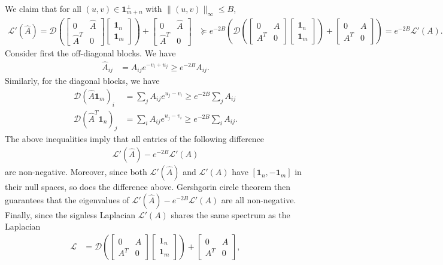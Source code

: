 We claim that for all $(u,v) \in \mathbf{1}_{m+n}^\perp$ with $\|(u,v)\|_\infty\leq B$, 
\begin{align*}
\mathcal{L}'(\hat{A})=\mathcal{D}(\begin{bmatrix}0 & \hat{A}\\
\hat{A}^{T} & 0
\end{bmatrix}\begin{bmatrix}\mathbf{1}_{n}\\
\mathbf{1}_{m}
\end{bmatrix})+\begin{bmatrix}0 & \hat{A}\\
\hat{A}^{T} & 0
\end{bmatrix} & \succeq e^{-2B}(\mathcal{D}(\begin{bmatrix}0 & A\\
A^{T} & 0
\end{bmatrix}\begin{bmatrix}\mathbf{1}_{n}\\
\mathbf{1}_{m}
\end{bmatrix})+\begin{bmatrix}0 & A\\
A^{T} & 0
\end{bmatrix})=e^{-2B}\mathcal{L}'(A).
\end{align*}
 Consider first the off-diagonal blocks. We have 
\begin{align*}
\hat{A}_{ij} & =A_{ij}e^{-v_{i}+u_{j}}\geq e^{-2B}A_{ij}.
\end{align*}
 Similarly, for the diagonal blocks, we have 
\begin{align*}
\mathcal{D}(\hat{A}\mathbf{1}_{m})_{i} & =\sum_{j}A_{ij}e^{u_{j}-v_{i}}\geq e^{-2B}\sum_{j}A_{ij}\\
\mathcal{D}(\hat{A}^{T}\mathbf{1}_{n})_{j} & =\sum_{i}A_{ij}e^{u_{j}-v_{i}}\geq e^{-2B}\sum_{i}A_{ij}.
\end{align*}
 The above inequalities imply that all entries of the following difference 
\begin{align*}
\mathcal{L}'(\hat{A})-e^{-2B}\mathcal{L}'(A)
\end{align*}
are non-negative. Moreover, since both $\mathcal{L}'(\hat{A})$ and
$\mathcal{L}'(A)$ have $[\mathbf{1}_{n},-\mathbf{1}_{m}]$ in their
null spaces, so does the difference above. Gershgorin circle theorem
then guarantees that the eigenvalues of $\mathcal{L}'(\hat{A})-e^{-2B}\mathcal{L}'(A)$
are all non-negative. Finally, since the signless Laplacian $\mathcal{L}'(A)$
shares the same spectrum as the Laplacian 
\begin{align*}
\mathcal{L} & =\mathcal{D}(\begin{bmatrix}0 & A\\
A^{T} & 0
\end{bmatrix}\begin{bmatrix}\mathbf{1}_{n}\\
\mathbf{1}_{m}
\end{bmatrix})+\begin{bmatrix}0 & A\\
A^{T} & 0
\end{bmatrix},
\end{align*}
